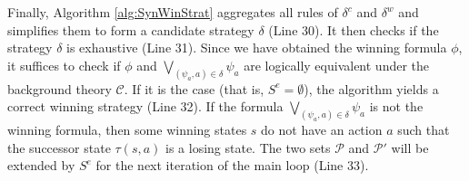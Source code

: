 \documentclass[review]{elsarticle}
\newcommand{\positiveSet}{\mathcal{P}}
\newcommand{\constraint}{\mathcal{C}}
\newcommand{\suc}{\tau}
\begin{document}
Finally, Algorithm \ref{alg:SynWinStrat} aggregates all rules of $\delta^c$ and $\delta^w$ and simplifies them to form a candidate strategy $\delta$ (Line 30).
It then checks if the strategy $\delta$ is exhaustive (Line 31).
Since we have obtained the winning formula $\phi$, it suffices to check if $\phi$ and $\bigvee_{(\psi_a, a) \in \delta} \psi_a$ are logically equivalent under the background theory $\constraint$. 
If it is the case (that is, $S^e = \emptyset$), the algorithm yields a correct winning strategy (Line 32).
If the formula $\bigvee_{(\psi_a, a) \in \delta} \psi_a$ is not the winning formula, then some winning states $s$ do not have an action $a$ such that the successor state $\suc(s, a)$ is a losing state.
The two sets $\positiveSet$ and $\positiveSet'$ will be extended by $S^e$ for the next iteration of the main loop (Line 33).

\end{document}
